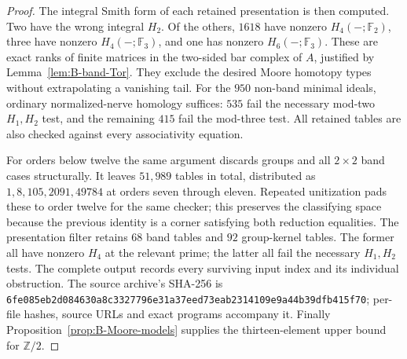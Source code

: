 \begin{proof}
The integral Smith form of each retained presentation is then computed.
Two have the wrong integral $H_2$.  Of the others, $1618$ have
nonzero $H_4(-;\mathbb F_2)$, three have nonzero
$H_4(-;\mathbb F_3)$, and one has nonzero
$H_6(-;\mathbb F_3)$.  These are exact ranks of finite matrices
in the two-sided bar complex of $A$, justified by
Lemma~\ref{lem:B-band-Tor}.  They exclude the desired Moore
homotopy types without extrapolating a vanishing tail.
For the $950$ non-band minimal ideals, ordinary normalized-nerve
homology suffices: $535$ fail the necessary mod-two $H_1,H_2$
test, and the remaining $415$ fail the mod-three test.
All retained tables are also checked against every associativity
equation.

For orders below twelve the same argument discards groups and all
$2\times2$ band cases structurally.  It leaves $51,989$ tables in
total, distributed as $1,8,105,2091,49784$ at orders seven through
eleven.  Repeated unitization pads these to order twelve for the same
checker; this preserves the classifying space because the previous
identity is a corner satisfying both reduction equalities.  The
presentation filter retains $68$ band tables and $92$ group-kernel
tables.  The former all have nonzero $H_4$ at the relevant prime;
the latter all fail the necessary $H_1,H_2$ tests.
The complete output records every surviving input index and its
individual obstruction.  The source archive's SHA-256 is
\texttt{6fe085eb2d084630a8c3327796e31a37}\allowbreak\texttt{eed73eab2314109e9a44b39dfb415f70};
per-file hashes, source URLs and exact programs accompany it.
Finally Proposition~\ref{prop:B-Moore-models} supplies the
thirteen-element upper bound for $\mathbb Z/2$.
\end{proof}

